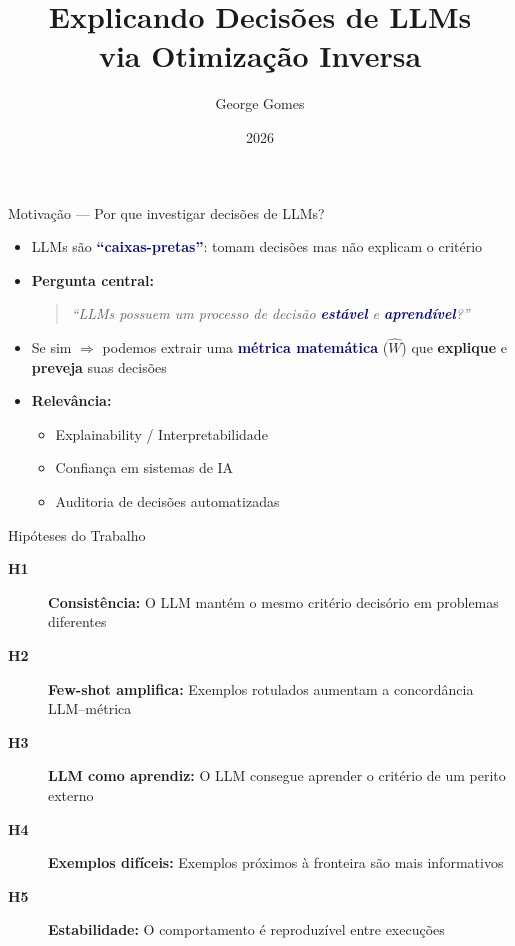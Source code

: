 \documentclass[aspectratio=169,12pt]{beamer}
\title[Decisões de LLMs via Otimização Inversa]{Explicando Decisões de LLMs\\via Otimização Inversa}
\author{George Gomes}
\institute{Programa de Pós-Graduação}
\date{2026}
\newcommand{\highlight}[1]{\textcolor{darkblue}{\textbf{#1}}}
\begin{document}
\begin{frame}[plain]
\titlepage
\end{frame}


\begin{frame}{Motivação --- Por que investigar decisões de LLMs?}
\begin{itemize}
    \item LLMs são \highlight{``caixas-pretas''}: tomam decisões mas não explicam o critério
    \item \textbf{Pergunta central:}
    \begin{quote}
        \emph{``LLMs possuem um processo de decisão \highlight{estável} e \highlight{aprendível}?''}
    \end{quote}
    \item Se sim $\Rightarrow$ podemos extrair uma \highlight{métrica matemática} ($\hat{W}$) que \textbf{explique} e \textbf{preveja} suas decisões
    \item \textbf{Relevância:}
    \begin{itemize}
        \item Explainability / Interpretabilidade
        \item Confiança em sistemas de IA
        \item Auditoria de decisões automatizadas
    \end{itemize}
\end{itemize}
\end{frame}

\begin{frame}{Hipóteses do Trabalho}
\begin{description}
    \item[\textbf{H1}] \textbf{Consistência:} O LLM mantém o mesmo critério decisório em problemas diferentes
    \item[\textbf{H2}] \textbf{Few-shot amplifica:} Exemplos rotulados aumentam a concordância LLM--métrica
    \item[\textbf{H3}] \textbf{LLM como aprendiz:} O LLM consegue aprender o critério de um perito externo
    \item[\textbf{H4}] \textbf{Exemplos difíceis:} Exemplos próximos à fronteira são mais informativos
    \item[\textbf{H5}] \textbf{Estabilidade:} O comportamento é reproduzível entre execuções
\end{description}
\end{frame}
\end{document}
